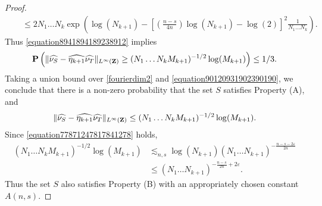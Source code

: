 \begin{proof}
\begin{align*}
        &\ \ \ \ \leq 2 N_1 \dots N_k \exp \left( \log(N_{k+1}) - \left[ \left( \frac{n - s}{4n} \right) \log(N_{k+1}) - \log(2) \right]^2 \frac{1}{N_1 \dots N_k} \right).
    \end{align*}
    Thus \eqref{equation8941894189238912} implies
    \begin{equation} \label{equation90120931902390190}
        \operatorname{\mathbf{P}} \left( \| \widehat{\nu_S} - \widehat{\eta_{k+1}} \widehat{\nu_T} \|_{L^\infty(\operatorname{\mathbf{Z}})} \geq (N_1 \dots N_k M_{k+1})^{-1/2} \log(M_{k+1}) \right) \leq 1/3.
    \end{equation}
    Taking a union bound over \eqref{fourierdim2} and \eqref{equation90120931902390190}, we conclude that there is a non-zero probability that the set $S$ satisfies Property (A), and
    \[ \| \widehat{\nu_S} - \widehat{\eta_{k+1}} \widehat{\nu_T} \|_{L^\infty(\operatorname{\mathbf{Z}})} \leq (N_1 \dots N_k M_{k+1})^{-1/2} \log(M_{k+1}). \]
    Since \eqref{equation77871247817841278} holds,
    \begin{align*}
        (N_1 \dots N_k M_{k+1})^{-1/2} \log(M_{k+1}) &\lesssim_{n,s} \log(N_{k+1}) (N_1 \dots N_{k+1})^{- \frac{n-s-2\varepsilon}{2n}}\\
        &\leq (N_1 \dots N_{k+1})^{- \frac{n-s}{2n} + 2\varepsilon}.
    \end{align*}
    Thus the set $S$ also satisfies Property (B) with an appropriately chosen constant $A(n,s)$.
\end{proof}

